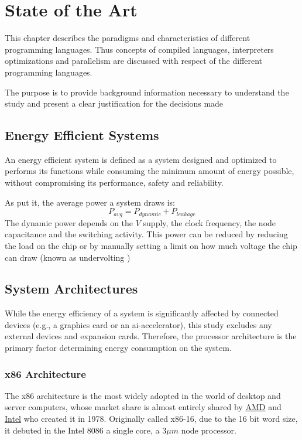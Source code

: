 \chapter{State of the Art}\label{chap:state-of-the-art}

This chapter describes the paradigms and characteristics of different programming languages. Thus concepts of compiled languages, interpreters optimizations and parallelism are discussed with respect of the different programming languages.


The purpose is to provide background information necessary to understand the study and present a clear justification for the decisions made


\section{Energy Efficient Systems}

An energy efficient system is defined as a system designed and optimized to performs its functions while consuming the minimum amount of energy possible, without compromising its performance, safety and reliability.

As \textcite{Muralidhar2020Energy} put it, the average power a system draws is:
$$P_{avg} = P_{dynamic} + P_{leakage}$$
The dynamic power depends on the $V$ supply, the clock frequency, the node capacitance and the switching activity. This power can be reduced by reducing the load on the chip or by manually setting a limit on how much voltage the chip can draw (known as undervolting \cite{undervolting-effects})


\section{System Architectures}

While the energy efficiency of a system is significantly affected by connected devices (e.g., a graphics card or an \gls{ai-accelerator}), this study excludes any external devices and expansion cards. Therefore, the processor architecture is the primary factor determining energy consumption on the system.

\subsection{x86 Architecture}
The x86 architecture is the most widely adopted in the world of desktop and server computers, whose market share is almost entirely shared by \href{https://amd.com}{AMD} and \href{https://intel.com}{Intel} who created it in 1978. Originally called x86-16, due to the 16 bit word size, it debuted in the Intel 8086 a single core, a $3 \mu m$ node processor.

